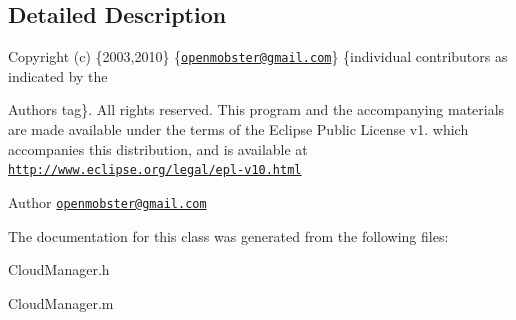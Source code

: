 \subsection{\-Detailed \-Description}
\-Copyright (c) \{2003,2010\} \{\href{mailto:openmobster@gmail.com}{\tt openmobster@gmail.\-com}\} \{individual contributors as indicated by the \begin{DoxyAuthor}{\-Authors}
tag\}. \-All rights reserved. \-This program and the accompanying materials are made available under the terms of the \-Eclipse \-Public \-License v1. which accompanies this distribution, and is available at \href{http://www.eclipse.org/legal/epl-v10.html}{\tt http\-://www.\-eclipse.\-org/legal/epl-\/v10.\-html}
\end{DoxyAuthor}
\begin{DoxyAuthor}{\-Author}
\href{mailto:openmobster@gmail.com}{\tt openmobster@gmail.\-com} 
\end{DoxyAuthor}


\-The documentation for this class was generated from the following files\-:\begin{DoxyCompactItemize}
\item 
\-Cloud\-Manager.\-h\item 
\-Cloud\-Manager.\-m\end{DoxyCompactItemize}
